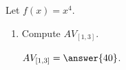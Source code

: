 \documentclass{ximera}
\author{Kenneth Berglund}
\begin{document}
\begin{exercise}

Let $f(x) = x^4$.

\begin{enumerate}
\item Compute $AV_{[1, 3]}$.

$AV_{[1, 3]} = \answer{40}$.  
	
\end{enumerate}

\end{exercise}
\end{document}
